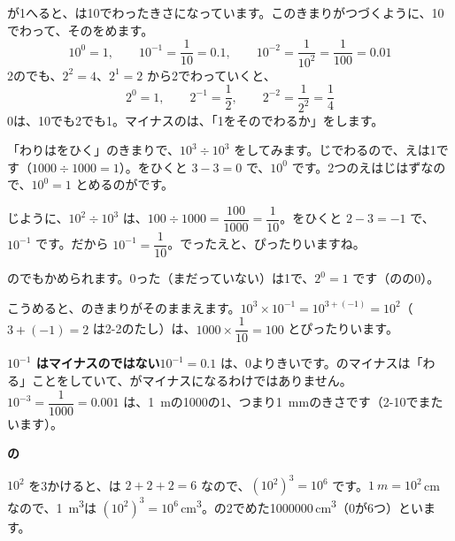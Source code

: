 が1へると、は10でわったきさになっています。このきまりがつづくように、10でわって、そのをめます。
\[ 10^0=1,\qquad 10^{-1}=\frac{1}{10}=0.1,\qquad 10^{-2}=\frac{1}{10^2}=\frac{1}{100}=0.01 \]
2のでも、$2^2=4$、$2^1=2$ から2でわっていくと、
\[ 2^0=1,\qquad 2^{-1}=\frac{1}{2},\qquad 2^{-2}=\frac{1}{2^2}=\frac{1}{4} \]
0は、10でも2でも1。マイナスのは、「1をそのでわるか」をします。

「わりはをひく」のきまりで、$10^3\div10^3$ をしてみます。じでわるので、えは1です（$1000\div1000=1$）。をひくと $3-3=0$ で、$10^0$ です。2つのえはじはずなので、$10^0=1$ とめるのがです。

じように、$10^2\div10^3$ は、$100\div1000=\dfrac{100}{1000}=\dfrac{1}{10}$。をひくと $2-3=-1$ で、$10^{-1}$ です。だから $10^{-1}=\dfrac{1}{10}$。でったえと、ぴったりいますね。

のでもかめられます。0った（まだっていない）は1で、$2^0=1$ です（\bkyattemiyouref のの0）。

こうめると、のきまりがそのままえます。$10^3\times10^{-1}=10^{3+(-1)}=10^2$（$3+(-1)=2$ は2-2のたし）は、$1000\times\dfrac{1}{10}=100$ とぴったりいます。

\noindent\textbf{$10^{-1}$ はマイナスのではない}\quad $10^{-1}=0.1$ は、0よりきいです。のマイナスは「わる」ことをしていて、がマイナスになるわけではありません。$10^{-3}=\dfrac{1}{1000}=0.001$ は、\qty{1}{m}の1000の1、つまり\qty{1}{mm}のきさです（2-10でまたいます）。


\begin{motto}[2]
\par\addvspace{3pt}\textbf{の}\par\noindent $10^2$ を3かけると、は $2+2+2=6$ なので、$(10^2)^3=10^6$ です。$\qty{1}{m}=10^2$\,cm なので、\qty{1}{m^3}は $(10^2)^3=10^6$\,\unit{cm^3}。の2でめた1000000\,\unit{cm^3}（0が6つ）といます。
\end{motto}

